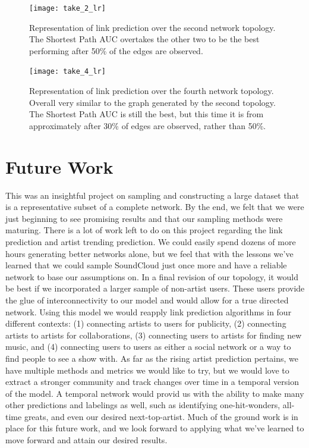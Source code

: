 \documentclass{article}
\begin{document}
\begin{figure}[h]
	\centering
	\texttt{[image: take\_2\_lr]}
	\caption{Representation of link prediction over the second network topology. The Shortest Path AUC overtakes the other two to be the best performing after 50\% of the edges are observed.}
\end{figure}

\begin{figure}[h]
	\centering
	\texttt{[image: take\_4\_lr]}
	\caption{Representation of link prediction over the fourth network topology. Overall very similar to the graph generated by the second topology. The Shortest Path AUC is still the best, but this time it is from approximately after 30\% of edges are observed, rather than 50\%.}
\end{figure}

\section{Future Work}
This was an insightful project on sampling and constructing a large dataset that is a representative subset of a complete network. By the end, we felt that we were just beginning to see promising results and that our sampling methods were maturing. There is a lot of work left to do on this project regarding the link prediction and artist trending prediction. We could easily spend dozens of more hours generating better networks alone, but we feel that with the lessons we've learned that we could sample SoundCloud just once more and have a reliable network to base our assumptions on. In a final revision of our topology, it would be best if we incorporated a larger sample of non-artist users. These users provide the glue of interconnectivity to our model and would allow for a true directed network. Using this model we would reapply link prediction algorithms in four different contexts: (1) connecting artists to users for publicity, (2) connecting artists to artists for collaborations, (3) connecting users to artists for finding new music, and (4) connecting users to users as either a social network or a way to find people to see a show with. As far as the rising artist prediction pertains, we have multiple methods and metrics we would like to try, but we would love to extract a stronger community and track changes over time in a temporal version of the model. A temporal network would provid us with the ability to make many other predictions and labelings as well, such as identifying one-hit-wonders, all-time greats, and even our desired next-top-artist. Much of the ground work is in place for this future work, and we look forward to applying what we've learned to move forward and attain our desired results. 
\end{document}
